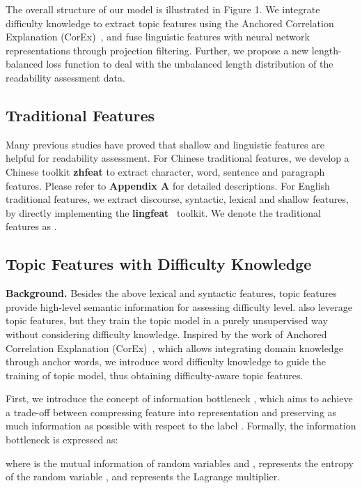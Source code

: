 \documentclass[11pt]{article}
\begin{document}
The overall structure of our model is illustrated in Figure 1. We integrate difficulty knowledge to extract topic features using the Anchored Correlation Explanation (CorEx)~\cite{gallagher2017anchored}, and fuse linguistic features with neural network representations through projection filtering.  
Further, we propose a new length-balanced loss function to deal with the unbalanced length distribution of the readability assessment data.


\subsection{Traditional Features}
Many previous studies have proved that shallow and linguistic features are helpful for readability assessment.
For Chinese traditional features, we develop a Chinese toolkit \textbf{zhfeat} to extract character, word, sentence and paragraph features. Please refer to \textbf{Appendix A} for detailed descriptions. For English traditional features, we extract discourse, syntactic, lexical and shallow features, by directly implementing the \textbf{lingfeat}~\cite{lee2021pushing} toolkit. We denote the traditional features as .


\subsection{Topic Features with Difficulty Knowledge}
\textbf{Background.} Besides the above lexical and syntactic features, topic features provide high-level semantic information for assessing difficulty level. \cite{lee2021pushing} also leverage topic features, but they train the topic model in a purely unsupervised way without considering difficulty knowledge. Inspired by the work of Anchored Correlation Explanation (CorEx)~\cite{gallagher2017anchored}, which allows integrating domain knowledge through anchor words, we introduce word difficulty knowledge to guide the training of topic model, thus obtaining difficulty-aware topic features.

First, we introduce the concept of information bottleneck \cite{tishby2000information}, which aims to achieve a trade-off between compressing feature  into representation  and preserving as much information as possible with respect to the label . Formally, the information bottleneck is expressed as:



where  is the mutual information of random variables  and ,  represents the entropy of the random variable , and  represents the Lagrange multiplier.
\end{document}
